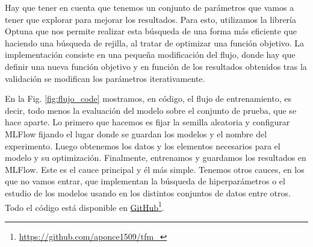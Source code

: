 \documentclass[a4paper,12pt,oneside,titlepage]{book}
\begin{document}
Hay que tener en cuenta que tenemos un conjunto de parámetros que vamos a tener que explorar para mejorar los resultados. Para esto, utilizamos la librería Optuna \cite{optuna} que nos permite realizar esta búsqueda de una forma más eficiente que haciendo una búsqueda de rejilla, al tratar de optimizar una función objetivo. La implementación consiste en una pequeña modificación del flujo, donde hay que definir una nueva función objetivo y en función de los resultados obtenidos tras la validación se modifican los parámetros iterativamente. 

En la Fig. \ref{fig:flujo_code} mostramos, en código, el flujo de entrenamiento, es decir, todo menos la evaluación del modelo sobre el conjunto de prueba, que se hace aparte. Lo primero que hacemos es fijar la semilla aleatoria y configurar MLFlow fijando el lugar donde se guardan los modelos y el nombre del experimento. Luego obtenemos los datos y los elementos necesarios para el modelo y su optimización. Finalmente, entrenamos y guardamos los resultados en MLFlow. Este es el cauce principal y él más simple. Tenemos otros cauces, en los que no vamos entrar, que implementan la búsqueda de hiperparámetros o el estudio de los modelos usando en los distintos conjuntos de datos entre otros. Todo el código está disponible en \href{https://github.com/aponce1509/tfm_}{GitHub}\footnote{\url{https://github.com/aponce1509/tfm_}}.
\end{document}
